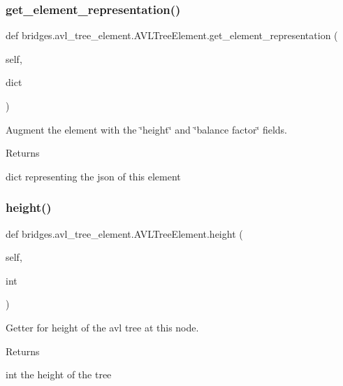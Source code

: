\subsubsection{\texorpdfstring{get\+\_\+element\+\_\+representation()}{get\_element\_representation()}}
{\footnotesize\ttfamily def bridges.\+avl\+\_\+tree\+\_\+element.\+A\+V\+L\+Tree\+Element.\+get\+\_\+element\+\_\+representation (\begin{DoxyParamCaption}\item[{}]{self,  }\item[{}]{dict }\end{DoxyParamCaption})}



Augment the element with the \char`\"{}height\char`\"{} and \char`\"{}balance factor\char`\"{} fields. 

\begin{DoxyReturn}{Returns}


dict representing the json of this element 
\end{DoxyReturn}
\mbox{\label{classbridges_1_1avl__tree__element_1_1_a_v_l_tree_element_ac262e026e103fc407f585dfc4dcfab9f}} 
\subsubsection{\texorpdfstring{height()}{height()}\hspace{0.1cm}{\footnotesize\ttfamily [1/2]}}
{\footnotesize\ttfamily def bridges.\+avl\+\_\+tree\+\_\+element.\+A\+V\+L\+Tree\+Element.\+height (\begin{DoxyParamCaption}\item[{}]{self,  }\item[{}]{int }\end{DoxyParamCaption})}



Getter for height of the avl tree at this node. 

\begin{DoxyReturn}{Returns}


int the height of the tree 
\end{DoxyReturn}
\mbox{\label{classbridges_1_1avl__tree__element_1_1_a_v_l_tree_element_a0ee04b3b15bbb37562e15fd882f1b0cd}} 
